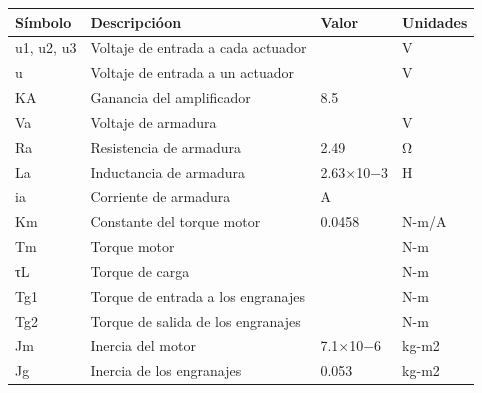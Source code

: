 \documentclass[conference]{IEEEtran}
\begin{document}
\begin{table}
\centering
\begin{tabular}{|l|l|l|l|} 
\hline
\rowcolor[rgb]{0.725,0.729,0.733} Símbolo & Descripcióon                                       & Valor     & Unidades   \\ 
\hline
u1, u2, u3                                & Voltaje de entrada a cada actuador                 &        & V          \\ 
\hline
u                                         & Voltaje de entrada a un actuador                   &        & V          \\ 
\hline
KA                                        & Ganancia del amplificador                          & 8.5       &        \\ 
\hline
Va                                        & Voltaje de armadura                                &        & V          \\ 
\hline
Ra                                        & Resistencia de armadura                            & 2.49      & Ω          \\ 
\hline
La                                        & Inductancia de armadura                            & 2.63×10−3 & H          \\ 
\hline
ia                                        & Corriente de armadura                              & A         &         \\ 
\hline
Km                                        & Constante del torque motor                         & 0.0458    & N-m/A      \\ 
\hline
Tm                                        & Torque motor                                       &        & N-m        \\ 
\hline
τL                                        & Torque de carga                                    &        & N-m        \\ 
\hline
Tg1                                       & Torque de entrada a los engranajes                 &        & N-m        \\ 
\hline
Tg2                                       & Torque de salida de los engranajes                 &        & N-m        \\ 
\hline
Jm                                        & Inercia del motor                                  & 7.1×10−6  & kg-m2      \\ 
\hline
Jg                                        & Inercia de los engranajes                          & 0.053     & kg-m2      \\ 

\end{tabular}
\end{table}
\end{document}
